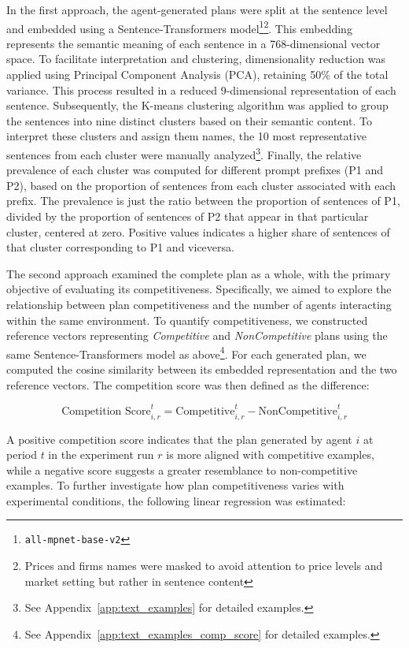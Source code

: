 In the first approach, the agent-generated plans were split at the sentence level and embedded using a Sentence-Transformers model\footnote{\texttt{all-mpnet-base-v2}}\footnote{Prices and firms names were masked to avoid attention to price levels and market setting but rather in sentence content}. This embedding represents the semantic meaning of each sentence in a 768-dimensional vector space. To facilitate interpretation and clustering, dimensionality reduction was applied using Principal Component Analysis (PCA), retaining 50\% of the total variance. This process resulted in a reduced 9-dimensional representation of each sentence. Subsequently, the K-means clustering algorithm was applied to group the sentences into nine distinct clusters based on their semantic content. To interpret these clusters and assign them names, the 10 most representative sentences from each cluster were manually analyzed\footnote{See Appendix~\ref{app:text_examples} for detailed examples.}. Finally, the relative prevalence of each cluster was computed for different prompt prefixes (P1 and P2), based on the proportion of sentences from each cluster associated with each prefix. The prevalence is just the ratio between the proportion of sentences of P1, divided by the proportion of sentences of P2 that appear in that particular cluster, centered at zero. Positive values indicates a higher share of sentences of that cluster corresponding to P1 and viceversa.

The second approach examined the complete plan as a whole, with the primary objective of evaluating its competitiveness. Specifically, we aimed to explore the relationship between plan competitiveness and the number of agents interacting within the same environment. To quantify competitiveness, we constructed reference vectors representing \textit{Competitive} and \textit{NonCompetitive} plans using the same Sentence-Transformers model as above\footnote{See Appendix~\ref{app:text_examples_comp_score} for detailed examples.}. For each generated plan, we computed the cosine similarity between its embedded representation and the two reference vectors. The competition score was then defined as the difference:

\begin{equation}
    \text{Competition Score}_{i,r}^{t} = \text{Competitive}_{i,r}^{t} - \text{NonCompetitive}_{i,r}^{t}
\end{equation}

A positive competition score indicates that the plan generated by agent $i$ at period $t$ in the experiment run $r$ is more aligned with competitive examples, while a negative score suggests a greater resemblance to non-competitive examples. To further investigate how plan competitiveness varies with experimental conditions, the following linear regression was estimated:

